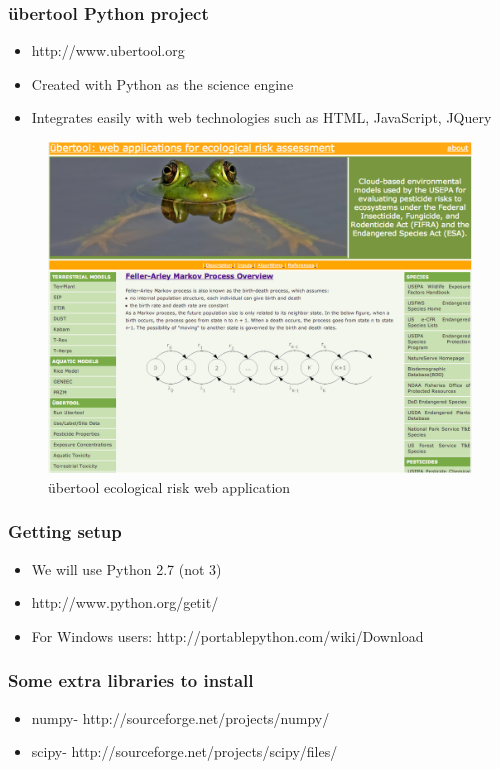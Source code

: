 \documentclass{beamer}
\begin{document}
\begin{frame}[fragile]
\frametitle{\"{u}bertool Python project}
\begin{itemize}
  \item{http://www.ubertool.org}
  \item{Created with Python as the science engine}
  \item{Integrates easily with web technologies such as HTML, JavaScript, JQuery}
\end{itemize} 
\begin{figure}
 \includegraphics[scale=0.18]{ubertool.png} 
 \caption{\"{u}bertool ecological risk web application}
\end{figure}
\end{frame}

\begin{frame}[fragile]
\frametitle{Getting setup}
\begin{itemize}
  \item{We will use Python 2.7 (not 3)}
  \item{http://www.python.org/getit/}
  \item{For Windows users: http://portablepython.com/wiki/Download}
\end{itemize} 
\end{frame}

\begin{frame}[fragile]
\frametitle{Some extra libraries to install}
\begin{itemize}
  \item{numpy- http://sourceforge.net/projects/numpy/}
  \item{scipy- http://sourceforge.net/projects/scipy/files/}
\end{itemize} 
\end{frame}
\end{document}
